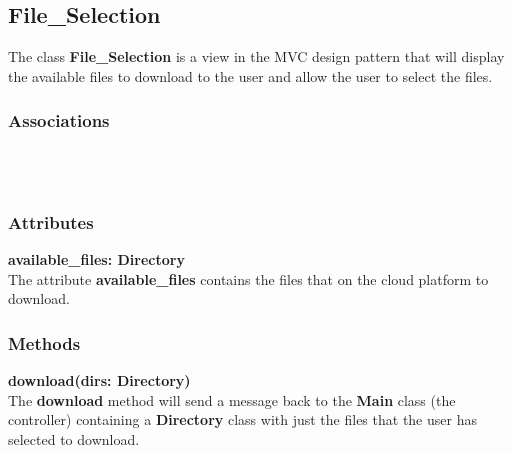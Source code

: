 \subsection{File\_Selection}
The class \textbf{File\_Selection} is a view in the MVC design pattern that will display
the available files to download to the user and allow the user to select the files.

\subsubsection{Associations}
\textbf{} \\

\textbf{} \\

\subsubsection{Attributes}
\textbf{available\_files: Directory} \\
The attribute \textbf{available\_files} contains the files that on the cloud platform to
download.

\subsubsection{Methods}
\textbf{download(dirs: Directory)} \\
The \textbf{download} method will send a message back to the \textbf{Main} class
(the controller) containing a \textbf{Directory} class with just the files that the user
has selected to download.
